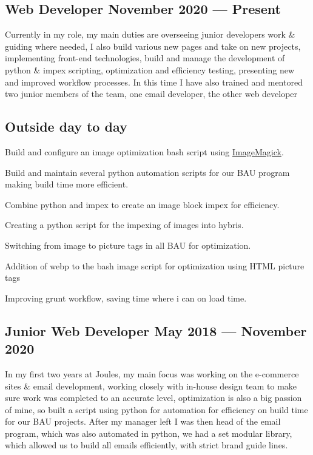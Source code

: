 
\subsection{{Web Developer \hfill November 2020 --- Present}}
\subtext{}
\subtext{}
Currently in my role, my main duties are overseeing junior developers work \& guiding where needed, I also build various new pages and take on new projects, implementing front-end technologies, build and manage the development of python \& impex scripting, optimization and efficiency testing, presenting new and improved workflow processes.
\newline
In this time I have also trained and mentored two junior members of the team, one email developer, the other web developer
\subsection{{Outside day to day}}
\begin{zitemize}
\item Build and configure an image optimization bash script using \href{https://imagemagick.org/index.php}{ImageMagick}.
\item Build and maintain several python automation scripts for our BAU program making build time more efficient.
\item Combine python and impex to create an image block impex for efficiency.
\item Creating a python script for the impexing of images into hybris.
\item Switching from image to picture tags in all BAU for optimization.
\item Addition of webp to the bash image script for optimization using HTML picture tags
\item Improving grunt workflow, saving time where i can on load time.



\end{zitemize}
\subsection{{Junior Web Developer \hfill May 2018 --- November 2020}}
\subtext{}
\subtext{}
In my first two years at Joules, my main focus was working on the e-commerce sites \& email development, working closely with in-house design team to make sure work was completed to an accurate level, optimization is also a big passion of mine, so built a script using python for automation for efficiency on build time for our BAU projects. 
\newline
After my manager left I was then head of the email program, which was also automated in python, we had a set modular library, which allowed us to build all emails efficiently, with strict brand guide lines.

